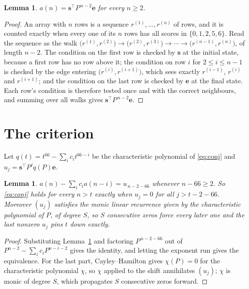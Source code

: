 \documentclass[11pt,a4paper]{article}
\theoremstyle{plain}
\newtheorem{lemma}[theorem]{Lemma}
\theoremstyle{definition}
\begin{document}
\begin{lemma}\label{lem:walk}
$a(n)=\mathbf{s}^{\!\top}P^{\,n-2}\mathbf{e}$ for every $n\ge2$.
\end{lemma}

\begin{proof}
An array with $n$ rows is a sequence $r^{(1)},\dots,r^{(n)}$ of rows, and it is counted
exactly when every one of its $n$ rows has all scores in $\{0,1,2,5,6\}$. Read the sequence as the
walk $\bigl(r^{(1)},r^{(2)}\bigr)\to\bigl(r^{(2)},r^{(3)}\bigr)\to\cdots\to
\bigl(r^{(n-1)},r^{(n)}\bigr)$, of length $n-2$. The condition on the first row is
checked by $\mathbf{s}$ at the initial state, because a first row has no row above it; the
condition on row $i$ for $2\le i\le n-1$ is checked by the edge entering
$\bigl(r^{(i)},r^{(i+1)}\bigr)$, which sees exactly $r^{(i-1)}$, $r^{(i)}$ and
$r^{(i+1)}$; and the condition on the last row is checked by $\mathbf{e}$ at the final
state. Each row's condition is therefore tested once and with the correct neighbours, and
summing over all walks gives $\mathbf{s}^{\!\top}P^{\,n-2}\mathbf{e}$.
\end{proof}

\section{The criterion}

Let $q(t)=t^{66}-\sum_i c_i t^{66-i}$ be the characteristic polynomial of
\eqref{eq:conj} and $u_j=\mathbf{s}^{\!\top}P^{j}q(P)\mathbf{e}$.

\begin{lemma}\label{lem:crit}
$a(n)-\sum_i c_i a(n-i)=u_{\,n-2-66}$ whenever $n-66\ge2$. So \eqref{eq:conj}
holds for every $n>t$ exactly when $u_j=0$ for all $j>t-2-66$. Moreover $(u_j)$
satisfies the monic linear recurrence given by the characteristic polynomial of $P$, of
degree $S$, so $S$ consecutive zeros force every later one and the last nonzero $u_j$ pins
$t$ down exactly.
\end{lemma}

\begin{proof}
Substituting Lemma~\ref{lem:walk} and factoring $P^{\,n-2-66}$ out of
$P^{n-2}-\sum_i c_i P^{n-i-2}$ gives the identity, and letting the exponent run gives the
equivalence. For the last part, Cayley--Hamilton gives $\chi(P)=0$ for the characteristic
polynomial $\chi$, so $\chi$ applied to the shift annihilates $(u_j)$; $\chi$ is monic of
degree $S$, which propagates $S$ consecutive zeros forward.
\end{proof}
\end{document}
